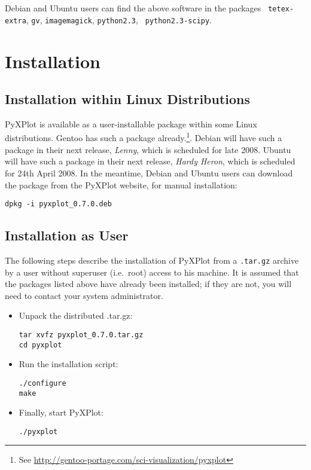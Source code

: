 Debian and Ubuntu users can find the above software in the packages {\tt
tetex-extra}, {\tt gv}, {\tt imagemagick}, {\tt python2.3}, {\tt
python2.3-scipy}.

\section{Installation}

\subsection{Installation within Linux Distributions}

PyXPlot is available as a user-installable package within some Linux
distributions. Gentoo has such a package already.\footnote{See
\url{http://gentoo-portage.com/sci-visualization/pyxplot}}. Debian will have
such a package in their next release, {\it Lenny}, which is scheduled for late
2008.  Ubuntu will have such a package in their next release, {\it Hardy
Heron}, which is scheduled for 24th April 2008. In the meantime, Debian and
Ubuntu users can download the package from the PyXPlot website, for manual
installation:

\begin{verbatim}
dpkg -i pyxplot_0.7.0.deb
\end{verbatim}

\subsection{Installation as User}

The following steps describe the installation of PyXPlot from a {\tt .tar.gz}
archive by a user without superuser (i.e.\ root) access to his machine. It is
assumed that the packages listed above have already been installed; if they are
not, you will need to contact your system
administrator.

\begin{itemize}
\item Unpack the distributed .tar.gz:

\begin{verbatim}
tar xvfz pyxplot_0.7.0.tar.gz
cd pyxplot
\end{verbatim}

\item Run the installation script:

\begin{verbatim}
./configure
make
\end{verbatim}

\item Finally, start PyXPlot:

\begin{verbatim}
./pyxplot
\end{verbatim}

\end{itemize}

